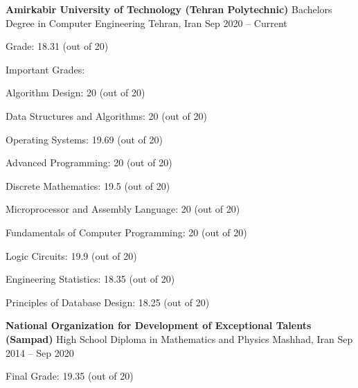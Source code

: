 \documentclass[]{awesome-cv}
\begin{document}
\begin{cventries}
	\cventry
	{\textbf{Amirkabir University of Technology (Tehran Polytechnic)}}
	{Bachelor\textquotesingle{}s Degree in Computer Engineering}
	{Tehran, Iran}
	{Sep 2020 – Current}
	{\begin{cvitems}
		\vspace{1mm}
		\item[] {\hspace{-9mm} Grade: 18.31 (out of 20)}
		\vspace{1mm}
		\item[] {\hspace{-9mm} Important Grades:}
		\vspace{1mm}
		  \item {Algorithm Design: 20 (out of 20)}
        \vspace{1mm}
        \item {Data Structures and Algorithms: 20 (out of 20)}
        \vspace{1mm}
        \item {Operating Systems: 19.69 (out of 20)}
        \vspace{1mm}
        \item {Advanced Programming: 20 (out of 20)}
        \vspace{1mm}
        \item {Discrete Mathematics: 19.5 (out of 20)}
        \vspace{1mm}
        \item {Microprocessor and Assembly Language: 20 (out of 20)}
        \vspace{1mm}
        \item {Fundamentals of Computer Programming: 20 (out of 20)}
        \vspace{1mm}
        \item {Logic Circuits: 19.9 (out of 20)}
        \vspace{1mm}
        \item {Engineering Statistics: 18.35 (out of 20)}
        \vspace{1mm}
        \item {Principles of Database Design: 18.25 (out of 20)}
	\end{cvitems}}
	\cventry
	{\textbf{National Organization for Development of Exceptional Talents (Sampad)}}
	{High School Diploma in Mathematics and Physics}
	{Mashhad, Iran}
	{Sep 2014 – Sep 2020}
	{\begin{cvitems}
		\vspace{1mm}
		\item[] {\hspace{-9mm} Final Grade: 19.35 (out of 20)}
	\end{cvitems}}
\end{cventries}
\end{document}
